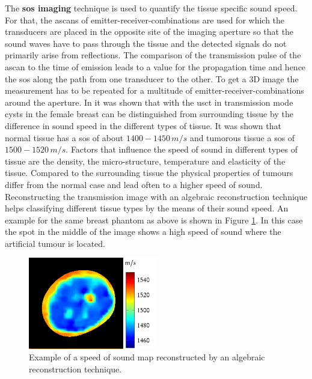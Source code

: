 \medskip

The \textbf{\ac{sos} imaging} technique is used to quantify the tissue specific sound speed. For that, the \acp{ascan} of  emitter-receiver-combinations are used for which the transducers are placed in the opposite site of the imaging aperture so that the sound waves have to pass through the tissue and the detected signals do not primarily arise from reflections. The comparison of the transmission pulse of the \ac{ascan} to the time of emission leads to a value for the propagation time and hence the \ac{sos} along the path from one transducer to the other. To get a 3D image the measurement has to be repeated for a multitude of emitter-receiver-combinations around the aperture. In \cite{Greenleaf1981ClinicalTomography} it was shown that with the \ac{usct} in transmission mode cysts in the female breast can be distinguished from surrounding tissue by the difference in sound speed in the different types of tissue. It was shown that normal tissue has a \ac{sos} of about $1400-1450 \, m/s$ and tumorous tissue a \ac{sos} of $1500 - 1520\, m/s$. Factors that influence the speed of sound in different types of tissue are the density, the micro-structure, temperature and elasticity of the tissue. Compared to the surrounding tissue the physical properties of tumours differ from the normal case and lead often to a higher speed of sound. 
Reconstructing the transmission image with an algebraic reconstruction technique helps classifying different tissue types by the means of their sound speed. An example for the same breast phantom as above is shown in Figure \ref{sos_image}. In this case the spot in the middle of the image shows a high speed of sound where the artificial tumour is located.

\begin{figure}[H]
    \centering
    \includegraphics[width=0.50\textwidth]{Graphics/sos_example.png}
    \caption{ Example of a speed of sound map reconstructed by an algebraic reconstruction technique.}
    \label{sos_image}
\end{figure}


